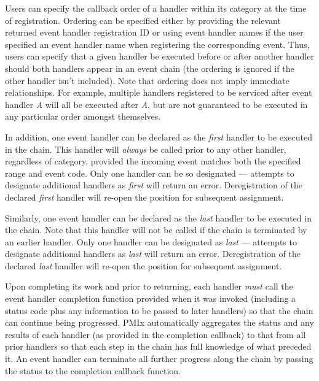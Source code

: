 Users can specify the callback order of a handler within its category at the time of registration. Ordering can be specified either by providing the relevant returned event handler registration ID or using event handler names if the user specified an event handler name when registering the corresponding event. Thus, users can specify that a given handler be executed before or after another handler should both handlers appear in an event chain (the ordering is ignored if the other handler isn't included). Note that ordering does not imply immediate relationships. For example, multiple handlers registered to be serviced after event handler \textit{A} will all be executed after \textit{A}, but are not guaranteed to be executed in any particular order amongst themselves.

In addition, one event handler can be declared as the \textit{first} handler to be executed in the chain. This handler will \textit{always} be called prior to any other handler, regardless of category, provided the incoming event matches both the specified range and event code. Only one handler can be so designated --- attempts to designate additional handlers as \textit{first} will return an error. Deregistration of the declared \textit{first} handler will re-open the position for subsequent assignment.

Similarly, one event handler can be declared as the \textit{last} handler to be executed in the chain. Note that this handler will not be called if the chain is terminated by an earlier handler. Only one handler can be designated as \textit{last} --- attempts to designate additional handlers as \textit{last} will return an error. Deregistration of the declared \textit{last} handler will re-open the position for subsequent assignment.

Upon completing its work and prior to returning, each handler \textit{must} call the event handler completion function provided when it was invoked (including a status code plus any information to be passed to later handlers) so that the chain can continue being progressed. \ac{PMIx} automatically aggregates the status and any results of each handler (as provided in the completion callback) to that from all prior handlers so that each step in the chain has full knowledge of what preceded it. An event handler can terminate all further progress along the chain by passing the  status to the completion callback function.


\subsection{}

